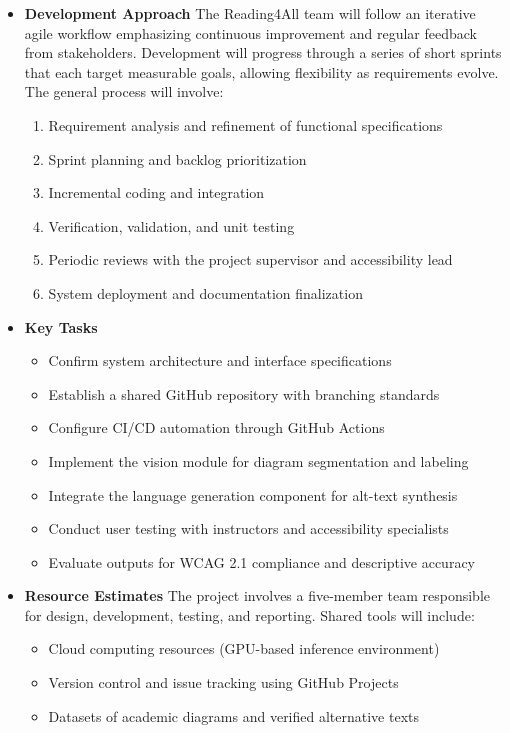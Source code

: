 \documentclass[12pt]{article}
\begin{document}
\begin{itemize}
    \item \textbf{Development Approach}  
    The Reading4All team will follow an iterative agile workflow emphasizing continuous improvement and regular feedback from stakeholders. Development will progress through a series of short sprints that each target measurable goals, allowing flexibility as requirements evolve. The general process will involve:
    \begin{enumerate}
        \item Requirement analysis and refinement of functional specifications
        \item Sprint planning and backlog prioritization
        \item Incremental coding and integration
        \item Verification, validation, and unit testing
        \item Periodic reviews with the project supervisor and accessibility lead
        \item System deployment and documentation finalization
    \end{enumerate}

    \item \textbf{Key Tasks}
    \begin{itemize}
        \item Confirm system architecture and interface specifications  
        \item Establish a shared GitHub repository with branching standards  
        \item Configure CI/CD automation through GitHub Actions  
        \item Implement the vision module for diagram segmentation and labeling  
        \item Integrate the language generation component for alt-text synthesis  
        \item Conduct user testing with instructors and accessibility specialists  
        \item Evaluate outputs for WCAG 2.1 compliance and descriptive accuracy  
    \end{itemize}

    \item \textbf{Resource Estimates}  
    The project involves a five-member team responsible for design, development, testing, and reporting. Shared tools will include:
    \begin{itemize}
        \item Cloud computing resources (GPU-based inference environment)  
        \item Version control and issue tracking using GitHub Projects  
        \item Datasets of academic diagrams and verified alternative texts  
    \end{itemize}


\end{itemize}
\end{document}
